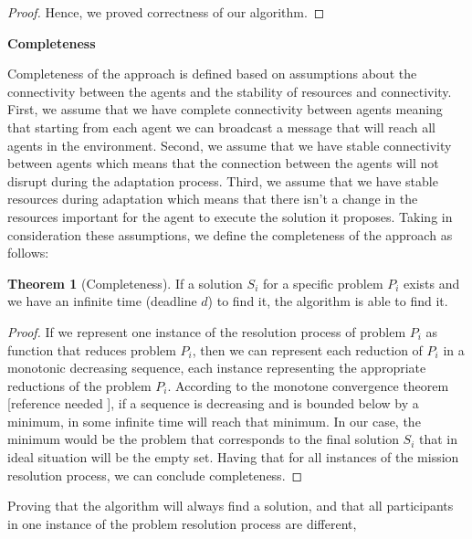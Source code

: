 \documentclass[journal]{IEEEtran}
\theoremstyle{definition}
\newtheorem{theorem}{Theorem}
\newcommand\darko[1]{\nb{Darko}{#1}}
\begin{document}
\begin{proof}

Hence, we proved correctness of our algorithm.

\end{proof}


\textbf{Completeness}

Completeness of the approach is defined based on assumptions about the connectivity between the agents and the stability of resources and connectivity.
First, we assume that we have complete connectivity between agents meaning that starting from each agent we can broadcast a message that will reach all agents in the environment. 
Second, we assume that we have stable connectivity between agents which means that the connection between the agents will not disrupt during the adaptation process. 
Third, we assume that we have stable resources during adaptation which means that there isn’t a change in the resources important for the agent to execute the solution it proposes.
Taking in consideration these assumptions, we define the completeness of the approach as follows:
\begin{theorem}[Completeness]
If a solution $S_i$ for a specific problem $P_i$ exists and we have an infinite time (deadline $d$) to find it, the algorithm is able to find it.
\end{theorem}
\begin{proof}
If we represent one instance of the resolution process of problem $P_i$ as function that reduces problem $P_i$, then we can represent each reduction of $P_i$ in a monotonic decreasing sequence, each instance representing the appropriate reductions of the problem $P_i$.
According to the monotone convergence theorem [reference needed \darko{Where to find good reference for this}], if a sequence is decreasing and is bounded below by a minimum, in some infinite time will reach that minimum. In our case, the minimum would be the problem that corresponds to the final solution $S_i$ that in ideal situation will be the empty set.
Having that for all instances of the mission resolution process, we can conclude completeness.
\end{proof}


Proving that the algorithm will always find a solution, and that all participants in one instance of the problem resolution process are different, 
\end{document}
